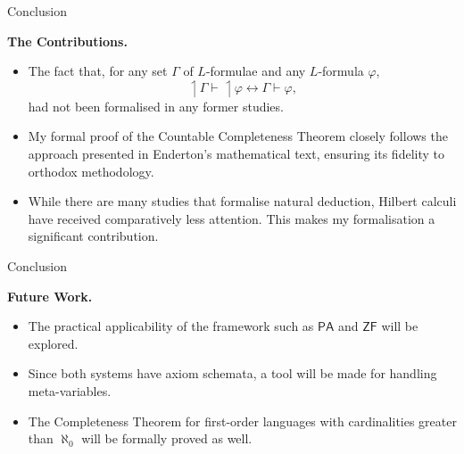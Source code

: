 \documentclass[serif,table,10pt]{beamer}
\newcommand{\0}{\texttt{0}}
\newcommand{\1}{\texttt{1}}
\newcommand{\embed}[1]{{\upharpoonleft} {#1}}
\begin{document}
\begin{frame}{Conclusion}

    \textbf{The Contributions.}

    \begin{itemize}
        \item The fact that, for any set $\Gamma$ of $L$-formulae and any $L$-formula $\varphi$, \[ \embed{\Gamma} \vdash \embed{\varphi} \leftrightarrow \Gamma \vdash \varphi , \] had not been formalised in any former studies.
        \item My formal proof of the Countable Completeness Theorem closely follows the approach presented in Enderton's mathematical text, ensuring its fidelity to orthodox methodology.
        \item While there are many studies that formalise natural deduction, Hilbert calculi have received comparatively less attention. This makes my formalisation a significant contribution.
    \end{itemize}

\end{frame}

\begin{frame}{Conclusion}

    \textbf{Future Work.}

    \begin{itemize}
        \item The practical applicability of the framework such as $\mathsf{PA}$ and $\mathsf{ZF}$ will be explored.
        \item Since both systems have axiom schemata, a tool will be made for handling meta-variables.
        \item The Completeness Theorem for first-order languages with cardinalities greater than $\aleph_0$ will be formally proved as well.
    \end{itemize}

\end{frame}
\end{document}
